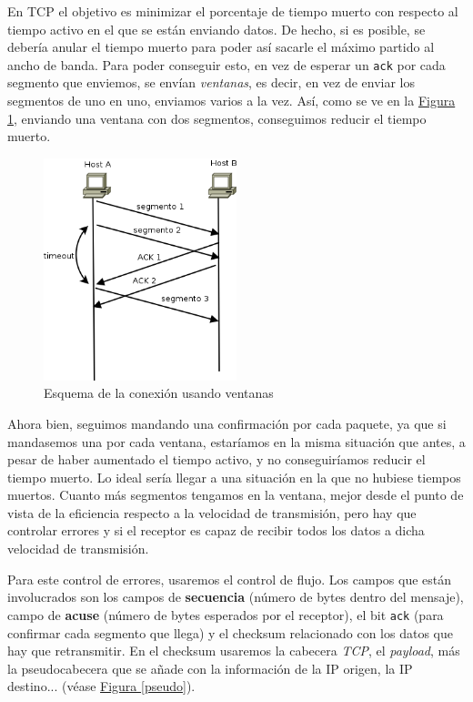 \documentclass[10pt,a4paper,spanish]{report}
\begin{document}
En TCP el objetivo es minimizar el porcentaje de tiempo muerto con respecto al tiempo activo en el que se están enviando datos. De hecho, si es posible, se debería anular el tiempo muerto para poder así sacarle el máximo partido al ancho de banda. Para poder conseguir esto, en vez de esperar un \texttt{ack} por cada segmento que enviemos, se envían \textcolor{tema3}{\textit{ventanas}}, es decir, en vez de enviar los segmentos de uno en uno, enviamos varios a la vez. Así, como se ve en la \hyperref[ventanatimeout]{Figura \ref*{ventanatimeout}}, enviando una ventana con dos segmentos, conseguimos reducir el tiempo muerto. 

\begin{figure}[!h]
  \centering
  \includegraphics[width=0.5\textwidth]{timeoutventana}
  \caption{Esquema de la conexión usando ventanas}
  \label{ventanatimeout}
\end{figure}

Ahora bien, seguimos mandando una confirmación por cada paquete, ya que si mandasemos una por cada ventana, estaríamos en la misma situación que antes, a pesar de haber aumentado el tiempo activo, y no conseguiríamos reducir el tiempo muerto. Lo ideal sería llegar a una situación en la que no hubiese tiempos muertos. Cuanto más segmentos tengamos en la ventana, mejor desde el punto de vista de la eficiencia respecto a la velocidad de transmisión, pero hay que controlar errores y si el receptor es capaz de recibir todos los datos a dicha velocidad de transmisión.

Para este control de errores, usaremos el control de flujo. Los campos que están involucrados son los campos de \textbf{\textcolor{tema3}{secuencia}} (número de bytes dentro del mensaje), campo de \textbf{\textcolor{tema3}{acuse}} (número de bytes esperados por el receptor), el bit \texttt{ack} (para confirmar cada segmento que llega) y el checksum relacionado con los datos que hay que retransmitir. En el checksum usaremos la cabecera \textit{\textcolor{tema3}{TCP}}, el \textit{\textcolor{tema3}{payload}}, más la pseudocabecera que se añade con la información de la IP origen, la IP destino... (véase \hyperref[pseudo]{Figura \ref*{pseudo}}). 
\end{document}
